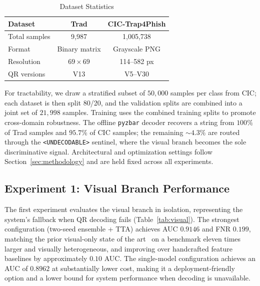 \documentclass[conference]{IEEEtran}
\begin{document}
\begin{table}[!t]
\caption{Dataset Statistics}
\label{tab:datasets}
\centering
\scriptsize
\begin{tabular}{lcc}
\toprule
\textbf{Dataset} & \textbf{Trad} & \textbf{CIC-Trap4Phish} \\
\midrule
Total samples & 9{,}987 & 1{,}005{,}738 \\
Format & Binary matrix & Grayscale PNG \\
Resolution & $69\times69$ & 114--582 px \\
QR versions & V13 & V5--V30 \\
\bottomrule
\end{tabular}
\end{table}

For tractability, we draw a stratified subset of $50{,}000$ samples per class from CIC; each dataset is then split 80/20, and the validation splits are combined into a joint set of $21{,}998$ samples. Training uses the combined training splits to promote cross-domain robustness. The offline \texttt{pyzbar} decoder recovers a string from $100\%$ of Trad samples and $95.7\%$ of CIC samples; the remaining $\sim$$4.3\%$ are routed through the \texttt{<UNDECODABLE>} sentinel, where the visual branch becomes the sole discriminative signal. Architectural and optimization settings follow Section~\ref{sec:methodology} and are held fixed across all experiments.

\subsection{Experiment 1: Visual Branch Performance}

The first experiment evaluates the visual branch in isolation, representing the system's fallback when QR decoding fails (Table~\ref{tab:visual}). The strongest configuration (two-seed ensemble + TTA) achieves AUC $0.9146$ and FNR $0.199$, matching the prior visual-only state of the art~\cite{trad2025detecting} on a benchmark eleven times larger and visually heterogeneous, and improving over handcrafted feature baselines by approximately $0.10$ AUC. The single-model configuration achieves an AUC of $0.8962$ at substantially lower cost, making it a deployment-friendly option and a lower bound for system performance when decoding is unavailable.
\end{document}
